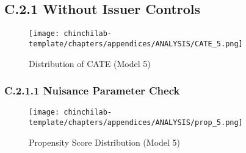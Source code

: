 \subsection{C.2.1 Without Issuer Controls}

\begin{figure}[H]
    \centering
    \texttt{[image: chinchilab-template/chapters/appendices/ANALYSIS/CATE\_5.png]}
    \caption{Distribution of CATE (Model 5)}
    \label{fig:my_label}
\end{figure}

\subsubsection{C.2.1.1 Nuisance Parameter Check}
\begin{figure}[H]
    \centering
    \texttt{[image: chinchilab-template/chapters/appendices/ANALYSIS/prop\_5.png]}
    \caption{Propensity Score Distribution (Model 5)}
    \label{fig:my_label}
\end{figure}


